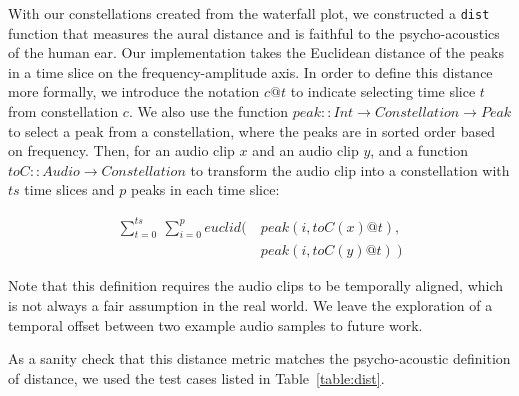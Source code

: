 With our constellations created from the waterfall plot, we constructed a \texttt{dist} function that measures the aural distance and is faithful to the psycho-acoustics of the human ear.
Our implementation takes the Euclidean distance of the peaks in a time slice on the frequency-amplitude axis.
In order to define this distance more formally, we introduce the notation $c@t$ to indicate selecting time slice $t$ from constellation $c$.
We also use the function $peak:: Int \to Constellation \to Peak$ to select a peak from a constellation, where the peaks are in sorted order based on frequency.
Then, for an audio clip $x$ and an audio clip $y$, and a function $toC :: Audio \to Constellation$ to transform the audio clip into a constellation with $ts$ time slices and $p$ peaks in each time slice:

\begin{align*}
\sum_{t=0}^{ts}\ \sum_{i=0}^{p} euclid\Big(\ &peak(i,toC(x)@t), \\ &peak(i,toC(y)@t)\ \Big)
\end{align*}

Note that this definition requires the audio clips to be temporally aligned, which is not always a fair assumption in the real world. We leave the exploration of a temporal offset between two example audio samples to future work.

As a sanity check that this distance metric matches the psycho-acoustic definition of distance, we used the test cases listed in Table~\ref{table:dist}.

